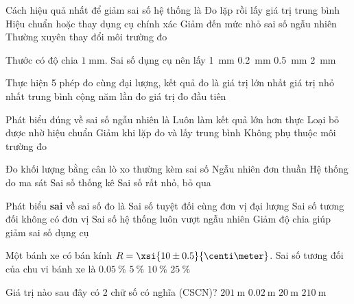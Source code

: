 \begin{ex}
	Cách hiệu quả nhất để giảm sai số hệ thống là
	\choice
	{Đo lặp rồi lấy giá trị trung bình}
	{\True Hiệu chuẩn hoặc thay dụng cụ chính xác}
	{Giảm đến mức nhỏ sai số ngẫu nhiên}
	{Thường xuyên thay đổi môi trường đo}
	\loigiai{}
\end{ex}

\begin{ex}
	Thước có độ chia \(1\;\si{\milli\meter}\). Sai số dụng cụ nên lấy
	\choice
	{\SI{1}{\milli\meter}}
	{\SI{0.2}{\milli\meter}}
	{\True \SI{0.5}{\milli\meter}}
	{\SI{2}{\milli\meter}}
	\loigiai{}
\end{ex}

\begin{ex}
	Thực hiện 5 phép đo cùng đại lượng, kết quả đo là
	\choice
	{giá trị lớn nhất}
	{giá trị nhỏ nhất}
	{\True trung bình cộng năm lần đo}
	{giá trị đo đầu tiên}
	\loigiai{}
\end{ex}

\begin{ex}
	Phát biểu đúng về sai số ngẫu nhiên là
	\choice
	{Luôn làm kết quả lớn hơn thực}
	{Loại bỏ được nhờ hiệu chuẩn}
	{\True Giảm khi lặp đo và lấy trung bình}
	{Không phụ thuộc môi trường đo}
	\loigiai{}
\end{ex}

\begin{ex}
	Đo khối lượng bằng cân lò xo thường kèm sai số
	\choice
	{Ngẫu nhiên đơn thuần}
	{\True Hệ thống do ma sát}
	{Sai số thống kê}
	{Sai số rất nhỏ, bỏ qua}
	\loigiai{}
\end{ex}

\begin{ex}
	Phát biểu \textbf{sai} về sai số đo là
	\choice
	{Sai số tuyệt đối cùng đơn vị đại lượng}
	{Sai số tương đối không có đơn vị}
	{\True Sai số hệ thống luôn vượt ngẫu nhiên}
	{Giảm độ chia giúp giảm sai số dụng cụ}
	\loigiai{}
\end{ex}

\begin{ex}
	Một bánh xe có bán kính $R=\xsi{10\pm0.5}{\centi\meter}$. Sai số tương đối của chu vi bánh xe là
	\choice
	{$\SI{0.05}{\percent}$}
	{\True $\SI{5}{\percent}$}
	{$\SI{10}{\percent}$}
	{$\SI{25}{\percent}$}
\end{ex}

\begin{ex}
	Giá trị nào sau đây có 2 chữ số có nghĩa (CSCN)?
	\choice
	{$\SI{201}{\meter}$}
	{$\SI{0.02}{\meter}$}
	{$\SI{20}{\meter}$}
	{\True $\SI{210}{\meter}$}
	\loigiai{}
\end{ex}

